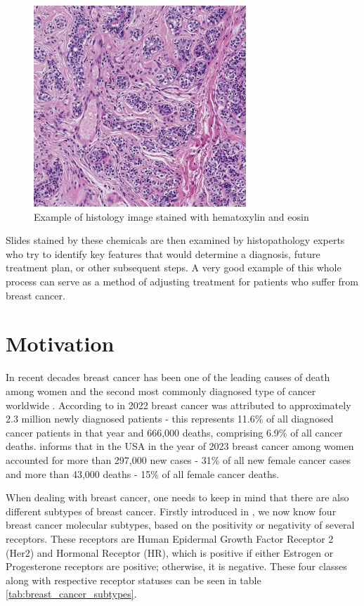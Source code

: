 \begin{figure}[h]
\begin{centering}
\includegraphics[width=8cm]{assets/images/histology_image_example.png}
\par\end{centering}
\caption{Example of histology image stained with hematoxylin and eosin \label{fig:h&e-image}}
\end{figure}

Slides stained by these chemicals are then examined by histopathology experts who try to identify key features that would determine a diagnosis, future treatment plan, or other subsequent steps. A very good example of this whole process can serve as a method of adjusting treatment for patients who suffer from breast cancer.

\section{Motivation}

In recent decades breast cancer has been one of the leading causes of death among women and the second most commonly diagnosed type of cancer worldwide \cite{Bray2024, Siegel2023}. According to \cite{Bray2024} in 2022 breast cancer was attributed to approximately 2.3 million newly diagnosed patients - this represents 11.6\% of all diagnosed cancer patients in that year and 666,000 deaths, comprising 6.9\% of all cancer deaths. \cite{Siegel2023} informs that in the USA in the year of 2023 breast cancer among women accounted for more than 297,000 new cases - 31\% of all new female cancer cases and more than 43,000 deaths - 15\% of all female cancer deaths.

When dealing with breast cancer, one needs to keep in mind that there are also different subtypes of breast cancer. Firstly introduced in \cite{Perou2000}, we now know four breast cancer molecular subtypes, based on the positivity or negativity of several receptors. These receptors are Human Epidermal Growth Factor Receptor 2 (Her2) and Hormonal Receptor (HR), which is positive if either Estrogen or Progesterone receptors are positive; otherwise, it is negative. These four classes along with respective receptor statuses can be seen in table \ref{tab:breast_cancer_subtypes}.

